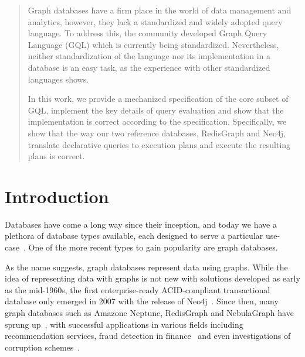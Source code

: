 \documentclass[14pt]{constructor-thesis}
\theoremstyle{definition}
\begin{document}
\begin{abstract}
  Graph databases have a firm place in the world of data management and analytics, however, they lack a standardized and widely adopted query language. To address this, the community developed Graph Query Language (GQL) which is currently being standardized. Nevertheless, neither standardization of the language nor its implementation in a database is an easy task, as the experience with other standardized languages shows.

  In this work, we provide a mechanized specification of the core subset of GQL, implement the key details of query evaluation and show that the implementation is correct according to the specification. Specifically, we show that the way our two reference databases, RedisGraph and Neo4j, translate declarative queries to execution plans and execute the resulting plans is correct.

\end{abstract}

\newpage

\tableofcontents
\section*{Introduction}

Databases have come a long way since their inception, and today we have a plethora of database types available, each designed to serve a particular use-case~\cite{database-types}. One of the more recent types to gain popularity are graph databases.

As the name suggests, graph databases represent data using graphs. While the idea of representing data with graphs is not new with solutions developed as early as the mid-1960s, the first enterprise-ready ACID-compliant transactional database only emerged in 2007 with the release of Neo4j~\cite{enwiki:1146498781}. Since then, many graph databases such as Amazone Neptune, RedisGraph and NebulaGraph have sprung up~\cite{enwiki:1146498781}, with successful applications in various fields including recommendation services, fraud detection in finance~\cite{neo4j:use-cases} and even investigations of corruption schemes~\cite{icij:offshoreleaks}.

\end{document}

